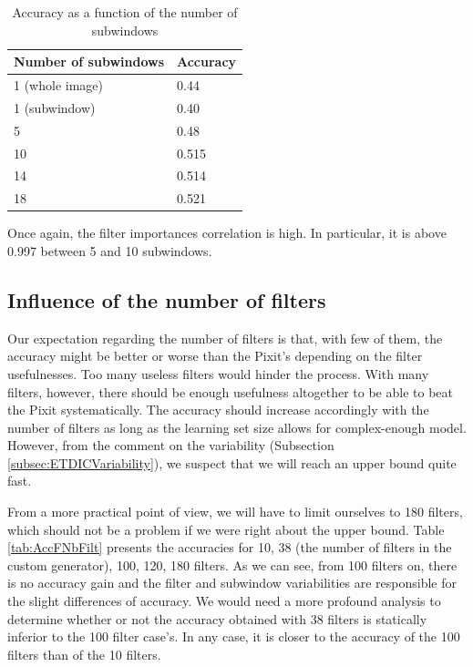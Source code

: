 \documentclass[a4paper]{report}
\begin{document}
		\begin{table}
			\centering
				\begin{tabular}{l|l}
				\hline
				Number of subwindows & Accuracy \\
				\hline \hline
				1 (whole image) & 0.44\\
				1 (subwindow) & 0.40 \\
				5 & 0.48 \\
				10 & 0.515 \\
				14 &  0.514\\
				18 &  0.521 \\
				\hline
				
				\end{tabular}
			\caption{\label{tab:AccFNbSW}Accuracy as a function of the number of subwindows}
		\end{table}
		
		
	\par
	Once again, the filter importances correlation is high. In particular, it is above 0.997 between 5 and 10 subwindows.
	
		
		
	\subsection{Influence of the number of filters}
	Our expectation regarding the number of filters is that, with few of them, the accuracy might be better or worse than the Pixit's depending on the filter usefulnesses. Too many useless filters would hinder the process. With many filters, however, there should be enough usefulness altogether to be able to beat the Pixit systematically. The accuracy should increase accordingly with the number of filters as long as the learning set size allows for complex-enough model. However, from the comment on the variability (Subsection \ref{subsec:ETDICVariability}), we suspect that we will reach an upper bound quite fast. 
	\par
	From a more practical point of view, we will have to limit ourselves to 180 filters, which should not be a problem if we were right about the upper bound. Table \ref{tab:AccFNbFilt} presents the accuracies for 10, 38 (the number of filters in the custom generator), 100, 120, 180 filters. As we can see, from 100 filters on, there is no accuracy gain and the filter and subwindow variabilities are responsible for the slight differences of accuracy. We would need a more profound analysis to determine whether or not the accuracy obtained with 38 filters is statically inferior to the 100 filter case's. In any case, it is closer to the accuracy of the 100 filters than of the 10 filters.
	
\end{document}
